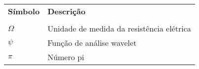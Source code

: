 \begin{thesissymbols}
\begin{footnotesize}
\begin{longtable}[l]{p{2cm}l}
    \textbf{Símbolo} & \textbf{Descrição} \\ \\
    $\Omega$          & Unidade de medida da resistência elétrica \\
    $\psi$            & Função de análise wavelet \\
    $\pi$             & Número pi \\
\end{longtable}
\end{footnotesize}
\end{thesissymbols}
